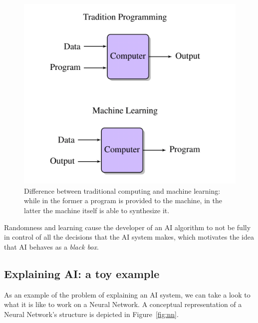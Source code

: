 \documentclass[conference]{IEEEtran}
\begin{document}
\begin{figure}[ht!] \centering \includegraphics[width=0.8 \linewidth]{images/ml.png}
    \caption{Difference between traditional computing and machine learning: while in the former a program is provided to the machine, in the latter the machine itself is able to synthesize it.}
    \label{fig:ml} \end{figure}


Randomness and learning cause the developer of an AI algorithm to not be fully in control of all the decisions that the AI system makes, which motivates the idea that AI behaves as a \textit{black box}.


\subsection{Explaining AI: a toy example}
\label{sec:example}

As an example of the problem of explaining an AI system, we can take a look to what it is like to work on a Neural Network. A conceptual representation of a
Neural Network's structure is depicted in Figure~\ref{fig:nn}.
\end{document}
